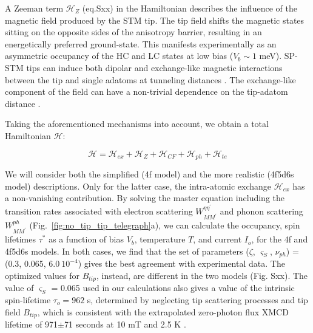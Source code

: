 \documentclass[
reprint,amsmath,amssymb,aps]{revtex4-2}
\begin{document}
A Zeeman term $\mathcal{H}_Z$ (eq.Sxx) in the Hamiltonian describes the influence of the magnetic field produced by the STM tip. The tip field shifts the magnetic states sitting on the opposite sides of the anisotropy barrier, resulting in an energetically preferred ground-state. This manifests experimentally as an asymmetric occupancy of the HC and LC states at low bias ($V_b\sim1$ meV). SP-STM tips can induce both dipolar and exchange-like magnetic interactions between the tip and single adatoms at tunneling distances \cite{yang2019}. The exchange-like component of the field can have a non-trivial dependence on the tip-adatom distance \cite{hauptmannQuantifyingExchangeForces2020,tao_SwitchingSingleSpin_2009,lazoFirstprinciplesStudyMagnetic2011,lazoRoleTipSize2008}.

Taking the aforementioned mechanisms into account, we obtain a total Hamiltonian $\mathcal{H}$:

\begin{equation}
\mathcal{H} = \mathcal{H}_{ex} + \mathcal{H}_{Z} + \mathcal{H}_{CF}  + \mathcal{H}_{ph} + \mathcal{H}_{te}
\end{equation}


We will consider both the simplified (4f model) and the more realistic (4f5d6s model) descriptions. Only for the latter case, the intra-atomic exchange $\mathcal{H}_{ex}$ has a non-vanishing contribution.
By solving the master equation including the transition rates associated with electron scattering $W_{MM^{\prime}}^{\eta \eta^{\prime}}$ and phonon scattering $W_{MM^{\prime}}^{ph}$ (Fig.~\ref{fig:no_tip_tip_telegraph}a), we can calculate the occupancy, spin lifetimes $\tau^{*}$ as a function of bias $V_{b}$, temperature $T$, and current $I_{o}$, for the 4f and 4f5d6s models. 
In both cases, we find that the set of parameters ($\zeta$, $\varsigma_S$, $\nu_{ph}$) = (0.3, 0.065, $6.0\ 10^{-4}$) gives the best agreement with experimental data. The optimized values for $B_{tip}$, instead, are different in the two models (Fig. Sxx).
The value of $\varsigma_S$ = 0.065 used in our calculations also gives a value of the intrinsic spin-lifetime $\tau_o=962$ s, determined by neglecting tip scattering processes and tip field $B_{tip}$, which is consistent with the extrapolated zero-photon flux XMCD lifetime of 971$\pm$71 seconds at 10 mT and 2.5 K \citep{baltic2016}.

\end{document}
